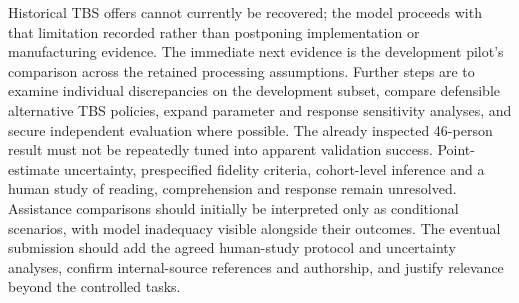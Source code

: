 \documentclass[11pt,a4paper]{article}
\begin{document}
Historical TBS offers cannot currently be recovered; the model proceeds with that limitation recorded rather than postponing implementation or manufacturing evidence. The immediate next evidence is the development pilot's comparison across the retained processing assumptions. Further steps are to examine individual discrepancies on the development subset, compare defensible alternative TBS policies, expand parameter and response sensitivity analyses, and secure independent evaluation where possible. The already inspected 46-person result must not be repeatedly tuned into apparent validation success. Point-estimate uncertainty, prespecified fidelity criteria, cohort-level inference and a human study of reading, comprehension and response remain unresolved. Assistance comparisons should initially be interpreted only as conditional scenarios, with model inadequacy visible alongside their outcomes. The eventual submission should add the agreed human-study protocol and uncertainty analyses, confirm internal-source references and authorship, and justify relevance beyond the controlled tasks.
\end{document}

